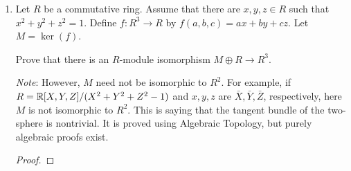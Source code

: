 \documentclass[../psets.tex]{subfiles}
\begin{document}
\begin{enumerate}
\begin{proof}
\begin{itemize}
            \begin{itemize}
                \item $A$-module homomorphism: It's just right multiplication.
                \item Injectivity: Apply the cancellation lemma for nonzero $(-d,c)$.
                \item Surjectivity:
                \begin{itemize}
                    \item We start with
                    \begin{equation*}
                        \{(u,v)\in A^2:\phi^{-1}(u,v)\in M\oplus 0\} = \{(u,v)\in A^2:uc+vd=0\}
                    \end{equation*}
                    \item We have
                    \begin{equation*}
                        ub = -kdb
                        = k(ac-1)
                        = kac-k
                        = av-k
                    \end{equation*}
                    so $k=av-ub$. Indeed,
                    \begin{equation*}
                        kc = avc-ubc
                        = v(1-bd)-ubc
                        = v-bd-bcu
                        = v-bd+vd
                    \end{equation*}
                    \item We want to find $(u,v)$ such that $(u,v)=k(-d,c)$. $\phi(m,0)$.
                    \item Swap $(-d,c)$ for $(-c,d)$??
                \end{itemize}
            \end{itemize}
            \item Use the "injectivity" and "surjectivity" of $\phi^{-1},\pi_2$ to complete the proof.
        \end{itemize}
    \end{proof}
    \item Let $R$ be a commutative ring. Assume that there are $x,y,z\in R$ such that $x^2+y^2+z^2=1$. Define $f:R^3\to R$ by $f(a,b,c)=ax+by+cz$. Let $M=\ker(f)$.\par
    Prove that there is an $R$-module isomorphism $M\oplus R\to R^3$.\par
    \emph{Note}: However, $M$ need not be isomorphic to $R^2$. For example, if $R=\mathbb{R}[X,Y,Z]/(X^2+Y^2+Z^2-1)$ and $x,y,z$ are $\bar{X},\bar{Y},\bar{Z}$, respectively, here $M$ is not isomorphic to $R^2$. This is saying that the tangent bundle of the two-sphere is nontrivial. It is proved using Algebraic Topology, but purely algebraic proofs exist.
    \begin{proof}


\end{proof}
\end{enumerate}
\end{document}
